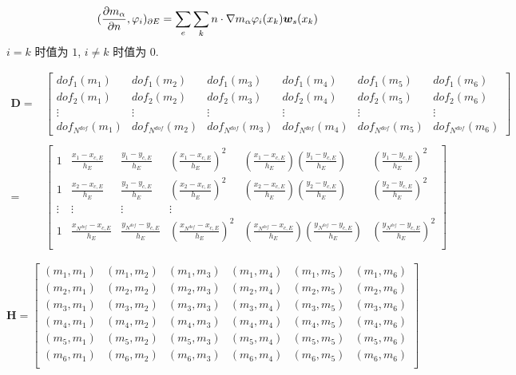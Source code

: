 \begin{equation*}
(\frac{\partial m_\alpha}{\partial n},\varphi_i)_{\partial E} =\sum_e\sum_k n\cdot\nabla m_\alpha \varphi_i(x_k)\boldsymbol{w}_s(x_k) \\
\end{equation*}
$i = k$ 时值为 $1$, $i \ne k$ 时值为 $0$.


\begin{equation*}
\begin{aligned}
\mathbf D = &\begin{bmatrix}
dof_1(m_1) & dof_1(m_2) &  dof_1(m_{3}) & dof_1(m_4) & dof_1(m_5) & dof_1(m_6) \\
dof_2(m_1) & dof_2(m_2) &  dof_2(m_{3}) & dof_2(m_4) & dof_2(m_5) & dof_2(m_6)\\
\vdots & \vdots & \vdots & \vdots & \vdots & \vdots \\
dof_{N^{dof}}(m_1) & dof_{N^{dof}}(m_2) & dof_{N^{dof}}(m_{3}) & dof_{N^{dof}}(m_{4}) & dof_{N^{dof}}(m_{5}) & dof_{N^{dof}}(m_{6})
\end{bmatrix} \\
\\
= & \begin{bmatrix}
1 & \frac{x_1 - x_{c,E}}{h_E} & \frac{y_1 - y_{c,E}}{h_E} & (\frac{x_1 - x_{c,E}}{h_E})^2 & (\frac{x_1 - x_{c,E}}{h_E})(\frac{y_1 - y_{c,E}}{h_E}) & (\frac{y_1 - y_{c,E}}{h_E})^2\\
1 & \frac{x_2 - x_{c,E}}{h_E} & \frac{y_2 - y_{c,E}}{h_E} & (\frac{x_2 - x_{c,E}}{h_E})^2 & (\frac{x_2 - x_{c,E}}{h_E})(\frac{y_2 - y_{c,E}}{h_E}) & (\frac{y_2 - y_{c,E}}{h_E})^2\\
\vdots &\vdots & \vdots & \vdots \\
1 & \frac{x_{N^{dof}} - x_{c,E}}{h_E} & \frac{y_{N^{dof}} - y_{c,E}}{h_E} & (\frac{x_{N^{dof}} - x_{c,E}}{h_E})^2 & (\frac{x_{N^{dof}} - x_{c,E}}{h_E})(\frac{y_{N^{dof}} - y_{c,E}}{h_E}) & (\frac{y_{N^{dof}} - y_{c,E}}{h_E})^2\\
\end{bmatrix}
\end{aligned}
\end{equation*}

\begin{equation*}
\mathbf H = \begin{bmatrix}
(m_1, m_1) & (m_1, m_2) & (m_1, m_{3}) & (m_1, m_4) & (m_1, m_5) & (m_1, m_6)\\
(m_2, m_1) & (m_2, m_2) & (m_2, m_{3}) & (m_2, m_4) & (m_2, m_5) & (m_2, m_6)\\
(m_3, m_1) & (m_3, m_2) & (m_3, m_{3}) & (m_3, m_4) & (m_3, m_5) & (m_3, m_6)\\
(m_4, m_1) & (m_4, m_2) & (m_4, m_{3}) & (m_4, m_4) & (m_4, m_5) & (m_4, m_6)\\
(m_5, m_1) & (m_5, m_2) & (m_5, m_{3}) & (m_5, m_4) & (m_5, m_5) & (m_5, m_6)\\
(m_6, m_1) & (m_6, m_2) & (m_6, m_{3}) & (m_6, m_4) & (m_6, m_5) & (m_6, m_6)\\
\end{bmatrix}
\end{equation*}



